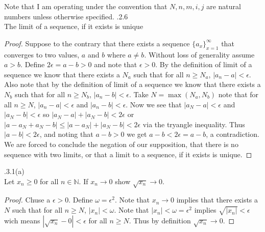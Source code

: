 \documentclass[12pt]{article}
\makeatletter
\theoremstyle{homework}
\newenvironment{exercise}[1]
{\def\@currentlabel{#1}\exercisecore}
{\endexercisecore}
\makeatother
\begin{document}
Note that I am operating under the convention that $N,n,m,i,j$ are natural numbers unless otherwise specified.
\begin{exercise}

2.2.6\\
The limit of a sequence, if it exists is unique
\end{exercise}
\begin{proof}
Suppose to the contrary that there exists a sequence $\{a_x\}^\infty_{x=1}$ that converges to two values, $a$ and $b$ where $a\neq b$.  Without loss of generality assume $a>b$.  Define $2\epsilon=a-b>0$ and note that $\epsilon>0$.  By the definition of limit of a sequence we know that there exists a $N_a$ such that for all $n\geq N_a$, $|a_n-a|<\epsilon$.  Also note that by the definition of limit of a sequence we know that there exists a $N_b$ such that for all $n\geq N_b$, $|a_n-b|<\epsilon$.  Take $N=\max(N_a,N_b)$ note that for all $n\geq N$, $|a_n-a|<\epsilon$ and $|a_n-b|<\epsilon$.  Now we see that $|a_N-a|<\epsilon$ and $|a_N-b|<\epsilon$ so $|a_N-a|+|a_N-b|<2\epsilon$ or $|a-a_N+a_N-b|\leq |a-a_N|+|a_N-b|<2\epsilon$ via the tryangle inequality.  Thus $|a-b|<2\epsilon$, and noting that $a-b>0$ we get $a-b<2\epsilon=a-b$, a contradiction.  We are forced to conclude the negation of our supposition, that there is no sequence with two limits, or that a limit to a sequence, if it exists is unique.
\end{proof}

\begin{exercise}

2.3.1(a)\\
Let $x_n\geq 0$ for all $n\in\mathbb{N}$.  If $x_n\rightarrow0$ show $\sqrt{x_n}\rightarrow0$.
\end{exercise}
\begin{proof}
Chuse a $\epsilon>0$.  Define $\omega=\epsilon^2$.  Note that $x_n\rightarrow0$ implies that there exists a $N$ such that for all $n\geq N$, $|x_n|<\omega$.  Note that $|x_n|<\omega=\epsilon^2$ implies $\sqrt{|x_n|}<\epsilon$ wich means $|\sqrt{x_n}-0|<\epsilon$ for all $n\geq N$.  Thus by definition $\sqrt{x_n}\rightarrow0$.
\end{proof}
\end{document}
